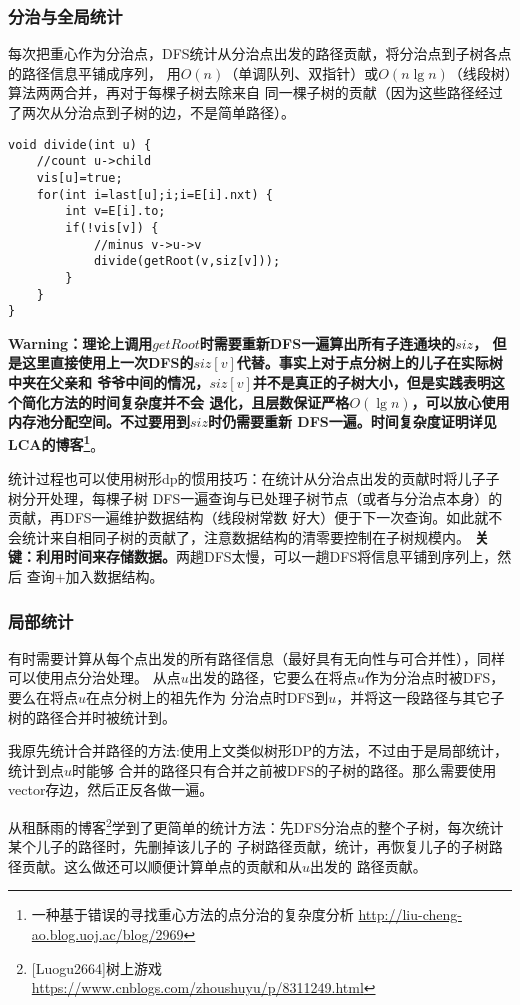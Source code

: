 \subsubsection{分治与全局统计}
每次把重心作为分治点，DFS统计从分治点出发的路径贡献，将分治点到子树各点的路径信息平铺成序列，
用$O(n)$（单调队列、双指针）或$O(n\lg n)$（线段树）算法两两合并，再对于每棵子树去除来自
同一棵子树的贡献（因为这些路径经过了两次从分治点到子树的边，不是简单路径）。

\begin{lstlisting}[title=divide]
void divide(int u) {
    //count u->child
    vis[u]=true;
    for(int i=last[u];i;i=E[i].nxt) {
        int v=E[i].to;
        if(!vis[v]) {
            //minus v->u->v
            divide(getRoot(v,siz[v]));
        }
    }
}
\end{lstlisting}

{\bfseries Warning：理论上调用$getRoot$时需要重新DFS一遍算出所有子连通块的$siz$，
但是这里直接使用上一次DFS的$siz[v]$代替。事实上对于点分树上的儿子在实际树中夹在父亲和
爷爷中间的情况，$siz[v]$并不是真正的子树大小，但是实践表明这个简化方法的时间复杂度并不会
退化，且层数保证严格$O(\lg n)$，可以放心使用内存池分配空间。不过要用到$siz$时仍需要重新
DFS一遍。时间复杂度证明详见LCA的博客\footnote{
    一种基于错误的寻找重心方法的点分治的复杂度分析
    \url{http://liu-cheng-ao.blog.uoj.ac/blog/2969}}}。

统计过程也可以使用树形dp的惯用技巧：在统计从分治点出发的贡献时将儿子子树分开处理，每棵子树
DFS一遍查询与已处理子树节点（或者与分治点本身）的贡献，再DFS一遍维护数据结构（线段树常数
好大）便于下一次查询。如此就不会统计来自相同子树的贡献了，注意数据结构的清零要控制在子树规模内。
{\bfseries 关键：利用时间来存储数据。}两趟DFS太慢，可以一趟DFS将信息平铺到序列上，然后
查询+加入数据结构。
\subsubsection{局部统计}
有时需要计算从每个点出发的所有路径信息（最好具有无向性与可合并性），同样可以使用点分治处理。
从点$u$出发的路径，它要么在将点$u$作为分治点时被DFS，要么在将点$u$在点分树上的祖先作为
分治点时DFS到$u$，并将这一段路径与其它子树的路径合并时被统计到。

我原先统计合并路径的方法:使用上文类似树形DP的方法，不过由于是局部统计，统计到点$u$时能够
合并的路径只有合并之前被DFS的子树的路径。那么需要使用vector存边，然后正反各做一遍。

从租酥雨的博客\footnote{
    [Luogu2664]树上游戏\\
    \url{https://www.cnblogs.com/zhoushuyu/p/8311249.html}
}学到了更简单的统计方法：先DFS分治点的整个子树，每次统计某个儿子的路径时，先删掉该儿子的
子树路径贡献，统计，再恢复儿子的子树路径贡献。这么做还可以顺便计算单点的贡献和从$u$出发的
路径贡献。
